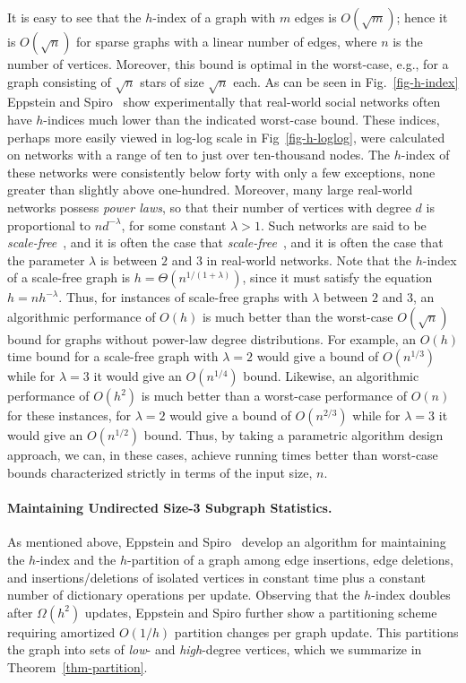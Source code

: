 \documentclass[11pt]{article}
\renewcommand{\subsection}[1]{\paragraph{\textbf{#1}.}}
\begin{document}
It is easy to see that the $h$-index of a graph with $m$ edges 
is $O(\sqrt{m})$; hence it is $O(\sqrt{n})$ for sparse graphs with a
linear number of edges, where $n$ is the number of vertices.
Moreover,
this bound is optimal in the worst-case, e.g., for a graph consisting
of $\sqrt{n}$ stars of size $\sqrt{n}$ each.
As can be seen in Fig.~\ref{fig-h-index} Eppstein and Spiro~\cite{es-hgadss-09} 
show experimentally that real-world social networks often have
$h$-indices much lower than the indicated worst-case bound.
These indices, perhaps more easily viewed in log-log scale in Fig~\ref{fig-h-loglog}, were calculated on
networks with a range of ten to just over ten-thousand nodes. The $h$-index of these networks were consistently below forty with only a few exceptions, 
none greater than slightly above one-hundred.
Moreover, many large real-world networks possess
\emph{power laws}, so that their number of vertices 
with degree $d$ is proportional to $nd^{-\lambda}$, for 
some constant $\lambda>1$.
Such networks are said to be 
\ifFull
\emph{scale-free}~\cite{AlbJeoBar-Nat-99,LilEdlAma-Nat-01,New-SIAM-03,Pri-Sci-65}, and it is often the case that
\else
\emph{scale-free}~\cite{AlbJeoBar-Nat-99,New-SIAM-03,Pri-Sci-65}, and it is often the case that
\fi
the parameter $\lambda$ is between $2$ and $3$ in real-world networks.
Note that the $h$-index of a scale-free graph is
 $h=\Theta(n^{1/(1+\lambda)})$, since it must satisfy the equation
 $h=nh^{-\lambda}$.
 Thus, for instances of scale-free graphs with $\lambda$ between $2$
 and $3$, an algorithmic performance of $O(h)$ is much better than
  the worst-case $O(\sqrt n)$ bound for graphs without power-law degree 
  distributions. For example, an $O(h)$ time bound for a scale-free
  graph with
  $\lambda= 2$ would give a bound of $O(n^{1/3})$ while for $\lambda=3$
  it would give an $O(n^{1/4})$ bound. 
  Likewise, an algorithmic performance of $O(h^2)$ is much better
  than a worst-case performance of $O(n)$ for these instances, for
  $\lambda= 2$ would give a bound of $O(n^{2/3})$ while for $\lambda=3$
  it would give an $O(n^{1/2})$ bound. 
Thus, by taking a parametric algorithm design approach, we can,
in these cases, achieve running times
better than worst-case bounds characterized strictly
in terms of the input size, $n$.



\subsection{Maintaining Undirected Size-3 Subgraph Statistics}
As mentioned above,
Eppstein and Spiro~\cite{es-hgadss-09} 
develop an algorithm for maintaining the $h$-index and 
the $h$-partition of a graph among edge insertions, edge deletions,
and insertions/deletions of isolated vertices in constant time plus a constant
number of dictionary operations per update. Observing that the $h$-index 
doubles after $\Omega(h^2)$ updates, Eppstein and Spiro further show a 
partitioning scheme requiring amortized $O(1/h)$ partition changes per 
graph update. This partitions the graph into sets of \emph{low}- and
\emph{high}-degree vertices, which we summarize in Theorem~\ref{thm-partition}. 
\end{document}
